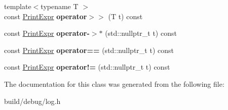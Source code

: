 \begin{DoxyCompactItemize}
\item 
\hypertarget{classPrintExpr_a444c58cf9d035e7ad00e3014c58bf61b}{{\footnotesize template$<$typename T $>$ }\\const \hyperlink{classPrintExpr}{Print\-Expr} {\bfseries operator$>$$>$} (T t) const }\label{classPrintExpr_a444c58cf9d035e7ad00e3014c58bf61b}

\item 
\hypertarget{classPrintExpr_ab0ae1579a1ae2d291d1670b164344b25}{const \hyperlink{classPrintExpr}{Print\-Expr} {\bfseries operator-\/$>$$\ast$} (std\-::nullptr\-\_\-t t) const }\label{classPrintExpr_ab0ae1579a1ae2d291d1670b164344b25}

\item 
\hypertarget{classPrintExpr_ae04e978fc3ae6a32ead1e5cdee461574}{const \hyperlink{classPrintExpr}{Print\-Expr} {\bfseries operator==} (std\-::nullptr\-\_\-t t) const }\label{classPrintExpr_ae04e978fc3ae6a32ead1e5cdee461574}

\item 
\hypertarget{classPrintExpr_afe8557361178282251c441176d962140}{const \hyperlink{classPrintExpr}{Print\-Expr} {\bfseries operator!=} (std\-::nullptr\-\_\-t t) const }\label{classPrintExpr_afe8557361178282251c441176d962140}

\end{DoxyCompactItemize}


The documentation for this class was generated from the following file\-:\begin{DoxyCompactItemize}
\item 
build/debug/log.\-h\end{DoxyCompactItemize}
